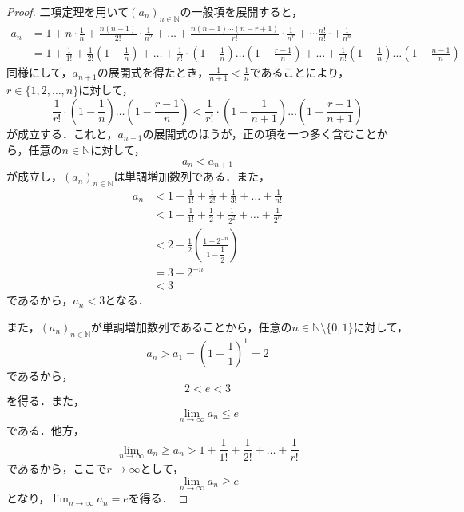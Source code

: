 \documentclass[uplatex,dvipdfmx,a4paper,10pt,fleqn]{jsarticle}
\begin{document}
\begin{tleftbar}
	\begin{proof}
		二項定理を用いて$(a_n)_{n \in \mathbb{N}}$の一般項を展開すると，
		\begin{align*}
			a_n & =  1 + n \cdot \frac{1}{n} + \frac{n(n-1)}{2!} \cdot \frac{1}{n^2} + \dots + \frac{n(n-1)\cdots(n-r+1)}{r!} \cdot \frac{1}{n^r} + \cdots \frac{n!}{n!} \cdot + \frac{1}{n^n} \\
            & = 1+ \frac{1}{1!} + \frac{1}{2!} \left(1- \frac{1}{n} \right) + \dots + \frac{1}{r!} \cdot  \left(1 - \frac{1}{n} \right) \dots \left (1-\frac{r-1}{n} \right) + \dots +  \frac{1}{n!} \left(1 - \frac{1}{n} \right) \dots \left(1- \frac{n-1}{n} \right)
        \end{align*}
		同様にして，$a_{n+1}$の展開式を得たとき，$ \frac{1}{n+1} < \frac{1}{n}$であることにより，$r\in \{ 1,2,\dots ,n\}$に対して，
		\[
			\frac{1}{r!} \cdot  \left(1 - \frac{1}{n} \right) \dots \left (1-\frac{r-1}{n} \right) < \frac{1}{r!} \cdot  \left(1 - \frac{1}{n+1} \right) \dots \left (1-\frac{r-1}{n+1} \right)
		\]
		が成立する．これと，$a_{n+1}$の展開式のほうが，正の項を一つ多く含むことから，任意の$n \in \mathbb{N}$に対して，
		\[
			a_{n} < a_{n+1}
		\]
		が成立し，$(a_n)_{n \in \mathbb{N}}$は単調増加数列である．また，
		\begin{align*}
			\label{p32 問2 2}
			a_n &< 1 + \frac{1}{1!} + \frac{1}{2!} +\frac{1}{3!} + \dots + \frac{1}{n!} \\
			& <  1 + \frac{1}{1!} + \frac{1}{2}+ \frac{1}{2^2} + \dots + \frac{1}{2^n} \\
			& <  2 + \frac{1}{2} \left( \frac{ 1 - 2^{-n} }{ 1- \dfrac{1}{2} } \right)\\
			& =  3-2^{-n} \\
			& <  3
		\end{align*}
		であるから，$a_n < 3$となる．
        
        また，$(a_n)_{n \in \mathbb{N}}$が単調増加数列であることから，任意の$n \in \mathbb{N} \setminus \{0,1\}$に対して，
		\[
			a_n > a_1 = \left(1+\frac{1}{1}\right)^1 =2
		\]
		であるから，
        \[
            2<e<3
        \]
        を得る．また，
		\[
			\lim_{n \to \infty} a_n \le e
		\]
		である．他方，
		\[
			\lim_{n \to \infty} a_n \ge a_n > 1 + \frac{1}{1!} + \frac{1}{2!} + \dots + \frac{1}{r!}
		\]
		であるから，ここで$r \to \infty$として，
		\[
			\lim_{n \to \infty} a_n \ge e
		\]
		となり，$\lim_{n \to \infty} a_n =e$を得る．
	\end{proof}
\end{tleftbar}
\newpage 
\end{document}
